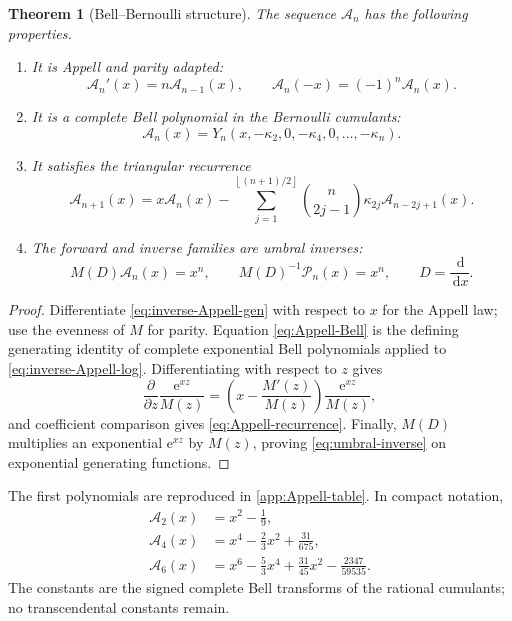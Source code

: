\documentclass[11pt]{article}
\numberwithin{equation}{section}
\newtheorem{theorem}{Theorem}[section]
\theoremstyle{definition}
\theoremstyle{remark}
\newcommand{\dd}{\,\mathrm d}
\newcommand{\e}{\mathrm e}
\newcommand{\floor}[1]{\left\lfloor#1\right\rfloor}
\newcommand{\Acal}{\mathscr A}
\newcommand{\Pcal}{\mathcal P}
\begin{document}
\begin{theorem}[Bell--Bernoulli structure]
\label{thm:Appell-Bell}
The sequence $\Acal_n$ has the following properties.
\begin{enumerate}
\item It is Appell and parity adapted:
\begin{equation}
 \Acal_n'(x)=n\Acal_{n-1}(x),
 \qquad
 \Acal_n(-x)=(-1)^n\Acal_n(x).
 \label{eq:Appell-basic}
\end{equation}
\item It is a complete Bell polynomial in the Bernoulli cumulants:
\begin{equation}
 \boxed{\displaystyle
 \Acal_n(x)=Y_n(x,-\kappa_2,0,-\kappa_4,0,\ldots,-\kappa_n).}
 \label{eq:Appell-Bell}
\end{equation}
\item It satisfies the triangular recurrence
\begin{equation}
 \Acal_{n+1}(x)
 =x\Acal_n(x)
 -\sum_{j=1}^{\floor{(n+1)/2}}
 \binom n{2j-1}\kappa_{2j}\Acal_{n-2j+1}(x).
 \label{eq:Appell-recurrence}
\end{equation}
\item The forward and inverse families are umbral inverses:
\begin{equation}
 M(D)\Acal_n(x)=x^n,
 \qquad
 M(D)^{-1}\Pcal_n(x)=x^n,
 \qquad D=\frac{\dd}{\dd x}.
 \label{eq:umbral-inverse}
\end{equation}
\end{enumerate}
\end{theorem}

\begin{proof}
Differentiate \eqref{eq:inverse-Appell-gen} with respect to $x$ for the Appell law; use the evenness of $M$ for parity.  Equation \eqref{eq:Appell-Bell} is the defining generating identity of complete exponential Bell polynomials applied to \eqref{eq:inverse-Appell-log}.  Differentiating with respect to $z$ gives
\[
 \frac{\partial}{\partial z}\frac{\e^{xz}}{M(z)}
 =\left(x-\frac{M'(z)}{M(z)}\right)\frac{\e^{xz}}{M(z)},
\]
and coefficient comparison gives \eqref{eq:Appell-recurrence}.  Finally, $M(D)$ multiplies an exponential $\e^{xz}$ by $M(z)$, proving \eqref{eq:umbral-inverse} on exponential generating functions.
\end{proof}

The first polynomials are reproduced in \cref{app:Appell-table}.  In compact notation,
\begin{align*}
 \Acal_2(x)&=x^2-\frac19,\\
 \Acal_4(x)&=x^4-\frac23x^2+\frac{31}{675},\\
 \Acal_6(x)&=x^6-\frac53x^4+\frac{31}{45}x^2-\frac{2347}{59535}.
\end{align*}
The constants are the signed complete Bell transforms of the rational cumulants; no transcendental constants remain.
\end{document}
